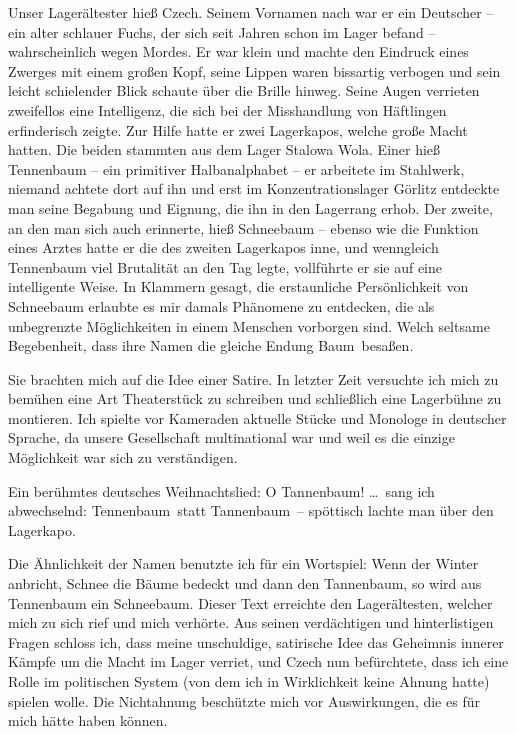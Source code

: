 \documentclass[a4paper,12pt,ngerman,
]{nisebook}
\begin{document}
Unser Lagerältester hieß Czech. Seinem Vornamen nach war er ein Deutscher -- ein alter schlauer Fuchs, der sich seit Jahren schon im Lager befand -- wahrscheinlich wegen Mordes. Er war klein und machte den Eindruck eines Zwerges mit einem großen Kopf, seine Lippen waren bissartig verbogen und sein leicht schielender Blick schaute über die Brille hinweg. Seine Augen verrieten zweifellos eine Intelligenz, die sich bei der Misshandlung von Häftlingen erfinderisch zeigte. Zur Hilfe hatte er zwei Lagerkapos, welche große Macht hatten. Die beiden stammten aus dem Lager Stalowa Wola. Einer hieß Tennenbaum -- ein primitiver Halbanalphabet -- er arbeitete im Stahlwerk, niemand achtete dort auf ihn und erst im Konzentrationslager Görlitz entdeckte man seine Begabung und Eignung, die ihn in den Lagerrang erhob. Der zweite, an den man sich auch erinnerte, hieß Schneebaum -- ebenso wie die Funktion eines Arztes hatte er die des zweiten Lagerkapos inne, und wenngleich Tennenbaum viel Brutalität an den Tag legte, vollführte er sie auf eine intelligente Weise. In Klammern gesagt, die erstaunliche Persönlichkeit von Schneebaum erlaubte es mir damals Phänomene zu entdecken, die als unbegrenzte Möglichkeiten in einem Menschen vorborgen sind. Welch seltsame Begebenheit, dass ihre Namen die gleiche Endung \glqq Baum\grqq~besaßen.

Sie brachten mich auf die Idee einer Satire. In letzter Zeit versuchte ich mich zu bemühen eine Art Theaterstück zu schreiben und schließlich eine Lagerbühne zu montieren. Ich spielte vor Kameraden aktuelle Stücke und Monologe in deutscher Sprache, da unsere Gesellschaft multinational war und weil es die einzige Möglichkeit war sich zu verständigen.

Ein berühmtes deutsches Weihnachtslied: \glqq O Tannenbaum! \dots\grqq~sang ich abwechselnd: \glqq Tennenbaum\grqq~statt \glqq Tannenbaum\grqq~-- spöttisch lachte man über den Lagerkapo.

Die Ähnlichkeit der Namen benutzte ich für ein Wortspiel: Wenn der Winter anbricht, Schnee die Bäume bedeckt und dann den Tannenbaum, so wird aus Tennenbaum ein Schneebaum. Dieser Text erreichte den Lagerältesten, welcher mich zu sich rief und mich verhörte. Aus seinen verdächtigen und hinterlistigen Fragen schloss ich, dass meine unschuldige, satirische Idee das Geheimnis innerer Kämpfe um die Macht im Lager verriet, und Czech nun befürchtete, dass ich eine Rolle im politischen System (von dem ich in Wirklichkeit keine Ahnung hatte) spielen wolle. Die Nichtahnung beschützte mich vor Auswirkungen, die es für mich hätte  haben können.
\end{document}
